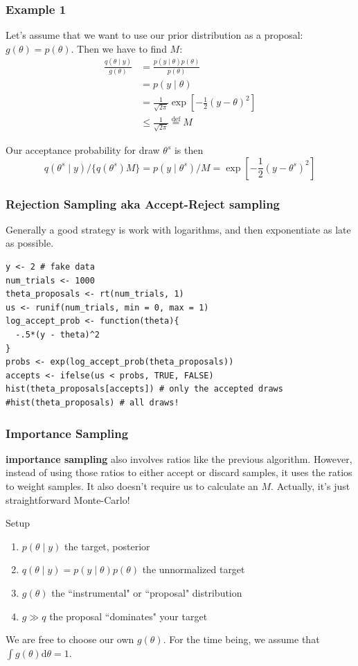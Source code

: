 \documentclass{beamer}
\begin{document}
\begin{frame}[fragile]
\frametitle{Example 1}

Let's assume that we want to use our prior distribution as a proposal: $g(\theta) = p(\theta)$. Then we have to find $M$:
\begin{align*}
\frac{q(\theta\mid y)}{g(\theta)} &= \frac{p(y \mid \theta) p(\theta)}{p(\theta)} \\
&= p(y \mid \theta) \\
&= \frac{1}{\sqrt{2\pi}} \exp\left[-\frac{1}{2} (y-\theta)^2 \right] \\
&\le \frac{1}{\sqrt{2\pi}} \overset{\text{def}}{=} M
\end{align*}

Our acceptance probability for draw $\theta^s$ is then
\[
q(\theta^s \mid y) / \{ q(\theta^s)  M\} = p(y \mid \theta^s) / M = \exp\left[-\frac{1}{2} (y-\theta^s)^2 \right]
\]


\end{frame}
\begin{frame}[fragile]
\frametitle{Rejection Sampling aka Accept-Reject sampling}

Generally a good strategy is work with logarithms, and then exponentiate as late as possible.
\begin{verbatim}
y <- 2 # fake data
num_trials <- 1000
theta_proposals <- rt(num_trials, 1)
us <- runif(num_trials, min = 0, max = 1)
log_accept_prob <- function(theta){
  -.5*(y - theta)^2
}
probs <- exp(log_accept_prob(theta_proposals))
accepts <- ifelse(us < probs, TRUE, FALSE)
hist(theta_proposals[accepts]) # only the accepted draws
#hist(theta_proposals) # all draws!
\end{verbatim}

\end{frame}
\begin{frame}[fragile]
\frametitle{Importance Sampling}

{\bf importance sampling} also involves ratios like the previous algorithm. However, instead of using those ratios to either accept or discard samples, it uses the ratios to weight samples. It also doesn't require us to calculate an $M$. Actually, it's just straightforward Monte-Carlo!
\newline
\pause

Setup
\begin{enumerate}
\item $p(\theta \mid y)$ the target, posterior
\item $q(\theta \mid y) = p(y \mid \theta) p(\theta)$ the unnormalized target
\item $g(\theta)$ the ``instrumental" or ``proposal" distribution
\item $g \gg q$ the proposal ``dominates" your target
\end{enumerate}
We are free to choose our own $g(\theta)$. For the time being, we assume that $\int g(\theta) \text{d}\theta = 1$.


\end{frame}
\end{document}
